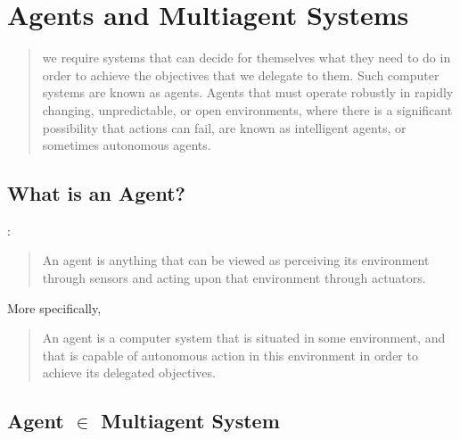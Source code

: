 \section{Agents and Multiagent Systems}

\begin{frame}{\insertsection}
    \blockquote[\cite{wooldridge2013IntelligentAgents}]{\textelp{} we require systems that can \alert{decide for themselves} what they need to do in order to achieve the objectives that we delegate to them. Such computer systems are known as \alert{agents}. Agents that must operate robustly in rapidly changing, unpredictable, or open environments, where there is a significant possibility that actions can \alert{fail}, are known as \alert{intelligent agents}, or sometimes \alert{autonomous agents}.}
\end{frame}



\subsection{What is an Agent?}

\begin{frame}{\insertsection: \insertsubsection}
    \onslide<+->
    \blockquote[{{\cite[p. 54]{russell2022ArtificialIntelligenceModern}}}]{An agent is \alert<2->{anything} that can be viewed as \alert<2->{perceiving} its environment through sensors and \alert<2->{acting} upon that environment through actuators.}

    \bigskip


    More specifically,
    
    \smallskip
    \blockquote[{{\cite{wooldridge2013IntelligentAgents}}}]{An agent is a computer system that is situated in some environment, and that is capable of \alert{autonomous} action in this environment in order to achieve its delegated objectives.}
\end{frame}

\begin{frame}{\insertsection}
\end{frame}




\subsection{Agent $\in$ Multiagent System}

